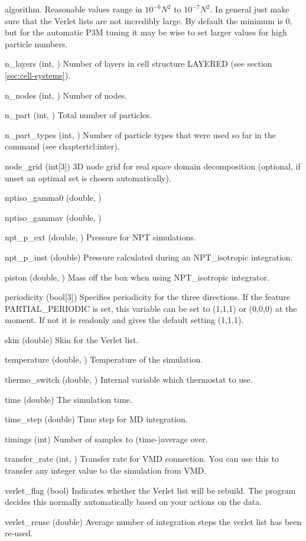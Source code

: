 \begin{globvar}
  algorithm. Reasonable values range in $10^{-6} N^2$ to $10^{-7}
  N^2$. In general just make sure that the Verlet lists are not
  incredibly large. By default the minimum is 0, but for the automatic
  P3M tuning it may be wise to set larger values for high particle
  numbers.
\item[n_layers] (int, \ro) Number of layers in cell structure LAYERED
  (see section \vref{sec:cell-systems}).
\item[n_nodes] (int, \ro) Number of nodes.
\item[n_part] (int, \ro) Total number of particles.
\item[n_part_types] (int, \ro) Number of particle types that were
  used so far in the  command (see chapter{tcl:inter}).
\item[node_grid] (int[3]) 3D node grid for real space domain
  decomposition (optional, if unset an optimal set is chosen
  automatically).
\item[nptiso_gamma0] (double, \ro)
\item[nptiso_gammav] (double, \ro)
\item[npt_p_ext] (double, \ro) Pressure for NPT simulations.
\item[npt_p_inst] (double) Pressure calculated during an
  NPT_isotropic integration.
\item[piston] (double, \ro) Mass off the box when using NPT_isotropic
  integrator.
\item[periodicity] (bool[3]) Specifies periodicity for the three
  directions. If the feature PARTIAL_PERIODIC is set, this variable
  can be set to (1,1,1) or (0,0,0) at the moment.  If not it is
  readonly and gives the default setting (1,1,1).
\item[skin] (double) Skin for the Verlet list.
\item [temperature] (double, \ro) Temperature of the
  simulation.
\item[thermo_switch] (double, \ro) Internal variable which thermostat
  to use. 
\item[time] (double) The simulation time.
\item[time_step] (double) Time step for MD integration.
\item[timings] (int) Number of samples to (time-)average over.
\item[transfer_rate] (int, \ro) Transfer rate for VMD connection. You
  can use this to transfer any integer value to the simulation from
  VMD.
\item[verlet_flag] (bool) Indicates whether the Verlet list will be
  rebuild. The program decides this normally automatically based on
  your actions on the data.
\item[verlet_reuse] (double) Average number of integration steps the
  verlet list has been re-used.
\end{globvar}

